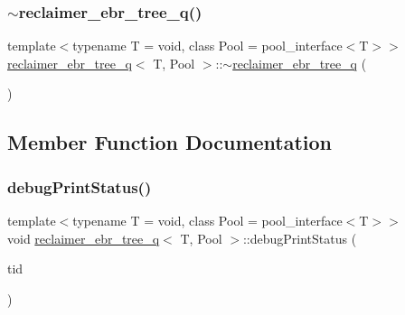\mbox{\label{classreclaimer__ebr__tree__q_a983350ea3cd56b26073a8c0f688b6c33}} 
\subsubsection{\texorpdfstring{$\sim$reclaimer\+\_\+ebr\+\_\+tree\+\_\+q()}{~reclaimer\_ebr\_tree\_q()}}
{\footnotesize\ttfamily template$<$typename T  = void, class Pool  = pool\+\_\+interface$<$\+T$>$$>$ \\
\hyperlink{classreclaimer__ebr__tree__q}{reclaimer\+\_\+ebr\+\_\+tree\+\_\+q}$<$ T, Pool $>$\+::$\sim$\hyperlink{classreclaimer__ebr__tree__q}{reclaimer\+\_\+ebr\+\_\+tree\+\_\+q} (\begin{DoxyParamCaption}{ }\end{DoxyParamCaption})\hspace{0.3cm}{\ttfamily [inline]}}



\subsection{Member Function Documentation}
\mbox{\label{classreclaimer__ebr__tree__q_a6a2106ba8affb3ae0935418868d995ce}} 
\subsubsection{\texorpdfstring{debug\+Print\+Status()}{debugPrintStatus()}}
{\footnotesize\ttfamily template$<$typename T  = void, class Pool  = pool\+\_\+interface$<$\+T$>$$>$ \\
void \hyperlink{classreclaimer__ebr__tree__q}{reclaimer\+\_\+ebr\+\_\+tree\+\_\+q}$<$ T, Pool $>$\+::debug\+Print\+Status (\begin{DoxyParamCaption}\item[{const int}]{tid }\end{DoxyParamCaption})\hspace{0.3cm}{\ttfamily [inline]}}

